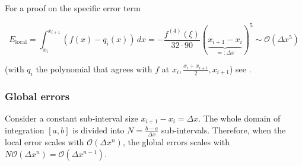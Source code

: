 For a proof on the specific error term

\begin{equation}
    E_\text{local} = \int_{x_i}^{x_{i+1}} (f(x) - q_i(x)) \, dx = -\frac{f^{(4)}(\xi)}{32 \cdot 90} (\underbrace{x_{i+1} - x_i}_{=: \Delta x})^5 \sim \mathcal{O}(\Delta x^5)
\end{equation}

(with $q_i$ the polynomial that agrees with $f$ at $x_i, \frac{x_i + x_{i+1}}{2}, x_{i+1}$) see \cite{simpson_error}.

\subsubsection{Global errors}

Consider a constant sub-interval size $x_{i+1} - x_i = \Delta x$. The whole
domain of integration $[a,b]$ is divided into $N = \frac{b-a}{\Delta x}$ sub-intervals.
Therefore, when the local error scales with $\mathcal{O}(\Delta x^n)$, the global errors
scales with $N \mathcal{O}(\Delta x^n) =  \mathcal{O}(\Delta x^{n-1})$.

\pagebreak
